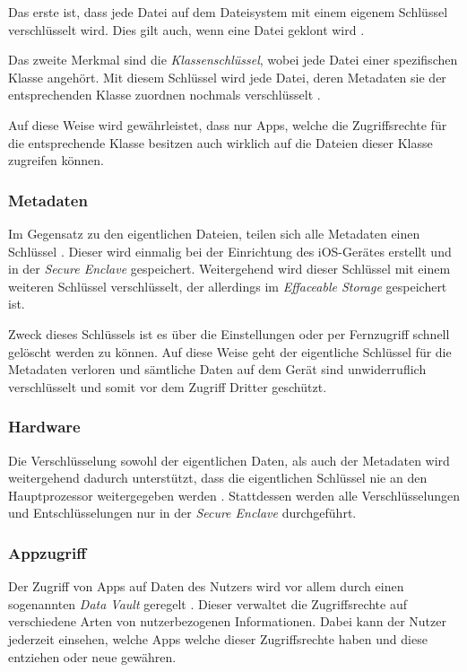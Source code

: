 Das erste ist, dass jede Datei auf dem Dateisystem mit einem ei\-ge\-nem Schlüs\-sel
verschlüsselt wird. Dies gilt auch, wenn eine Datei geklont wird \cite[S.
49]{apple2020}.

Das zweite Merkmal sind die \textit{Klassenschlüssel}, wobei jede Datei einer
spezifischen Klasse angehört. Mit diesem Schlüssel wird jede Datei, deren
Metadaten sie der entsprechenden Klasse zuordnen nochmals verschlüsselt \cite[S.
49]{apple2020}.

Auf diese Weise wird gewährleistet, dass nur Apps, welche die Zugriffsrechte für
die entsprechende Klasse besitzen auch wirklich auf die Dateien dieser Klasse
zugreifen können.

\subsubsection{Metadaten}
Im Gegensatz zu den eigentlichen Dateien, teilen sich alle Metadaten einen
Schlüssel \cite[S. 50]{apple2020}. Dieser wird einmalig bei der Einrichtung des
iOS-Gerätes erstellt und in der \textit{Secure Enclave} gespeichert.
Weitergehend wird dieser Schlüssel mit einem weiteren Schlüssel verschlüsselt,
der allerdings im \textit{Effaceable Storage} gespeichert ist.

Zweck dieses Schlüssels ist es über die Einstellungen oder per Fernzugriff
schnell gelöscht werden zu können. Auf diese Weise geht der eigentliche
Schlüssel für die Metadaten verloren und sämtliche Daten auf dem Gerät sind
unwiderruflich verschlüsselt und somit vor dem Zugriff Dritter geschützt.

\subsubsection{Hardware}
Die Verschlüsselung sowohl der eigentlichen Daten, als auch der Metadaten wird
weitergehend dadurch unterstützt, dass die eigentlichen Schlüssel nie an den
Hauptprozessor weitergegeben werden \cite[S. 50]{apple2020}. Stattdessen werden
alle Verschlüsselungen und Entschlüsselungen nur in der \textit{Secure Enclave}
durchgeführt.

\subsubsection{Appzugriff}
Der Zugriff von Apps auf Daten des Nutzers wird vor allem durch einen
sogenannten \textit{Data Vault} geregelt \cite[S. 47]{apple2020}. Dieser
verwaltet die Zugriffsrechte auf verschiedene Arten von nutzerbezogenen
Informationen. Dabei kann der Nutzer jederzeit einsehen, welche Apps welche
dieser Zugriffsrechte haben und diese entziehen oder neue gewähren.

